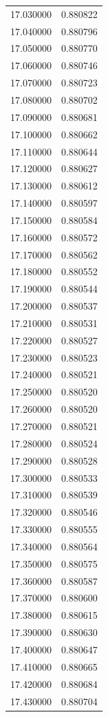 \begin{tabular}{rr}
17.030000 & 0.880822 \\
17.040000 & 0.880796 \\
17.050000 & 0.880770 \\
17.060000 & 0.880746 \\
17.070000 & 0.880723 \\
17.080000 & 0.880702 \\
17.090000 & 0.880681 \\
17.100000 & 0.880662 \\
17.110000 & 0.880644 \\
17.120000 & 0.880627 \\
17.130000 & 0.880612 \\
17.140000 & 0.880597 \\
17.150000 & 0.880584 \\
17.160000 & 0.880572 \\
17.170000 & 0.880562 \\
17.180000 & 0.880552 \\
17.190000 & 0.880544 \\
17.200000 & 0.880537 \\
17.210000 & 0.880531 \\
17.220000 & 0.880527 \\
17.230000 & 0.880523 \\
17.240000 & 0.880521 \\
17.250000 & 0.880520 \\
17.260000 & 0.880520 \\
17.270000 & 0.880521 \\
17.280000 & 0.880524 \\
17.290000 & 0.880528 \\
17.300000 & 0.880533 \\
17.310000 & 0.880539 \\
17.320000 & 0.880546 \\
17.330000 & 0.880555 \\
17.340000 & 0.880564 \\
17.350000 & 0.880575 \\
17.360000 & 0.880587 \\
17.370000 & 0.880600 \\
17.380000 & 0.880615 \\
17.390000 & 0.880630 \\
17.400000 & 0.880647 \\
17.410000 & 0.880665 \\
17.420000 & 0.880684 \\
17.430000 & 0.880704 \\

\end{tabular}
